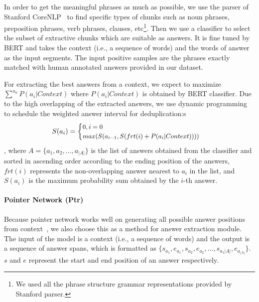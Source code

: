 In order to get the meaningful phrases as much as possible, we use the parser of Stanford CoreNLP~\cite{manning-EtAl:2014:P14-5} to find specific types of chunks such as noun phrases, preposition phrases, verb phrases, clauses, etc\footnote{We used all the phrase structure grammar representations provided by Stanford parser.}. 
Then we use a classifier to select the subset of extractive chunks which are suitable as answers.
It is fine tuned by BERT and takes the context (i.e., a sequence of words) and the words of answer as the input segments.
The input positive samples are the phrases exactly matched with human annotated answers provided in our dataset.

For extracting the best answers from a context, we expect to maximize $\sum^{n_a}P(a_i|Context)$ where $P(a_i|Context)$ is obtained by BERT classifier. 
Due to the high overlapping of the extracted answers, 
we use dynamic programming to schedule the weighted answer interval for deduplication:s
\begin{equation*}
\small
S(a_i) = \begin{cases}
0, i = 0\\
max(S(a_{i-1}, S(frt(i)+P(a_i|Context))))
\end{cases}
\end{equation*}
, where $A=\{a_1,a_2,...,a_{|A|}\}$ is the list of answers obtained from the classifier and sorted in ascending order according to the ending position of the answers,
$frt(i)$ 
represents the non-overlapping answer nearest to $a_i$ in the list,
and $S(a_i)$ is the maximum probability sum obtained by the $i$-th answer.


\paragraph{Pointer Network (Ptr)}
Because pointer network works well on generating all possible answer positions from context~\cite{subramanian2017neural},
we also choose this as a method for answer extraction module.
The input of the model is a context (i.e., a sequence of words) and the output is a sequence of answer spans, which is formatted as $\{s_{a_1}, e_{a_1},s_{a_2}, e_{a_2},...,s_{a_1{|A|}}, e_{a_{|A|}}\}$.
$s$ and $e$ represent the start and end position of an answer respectively.

